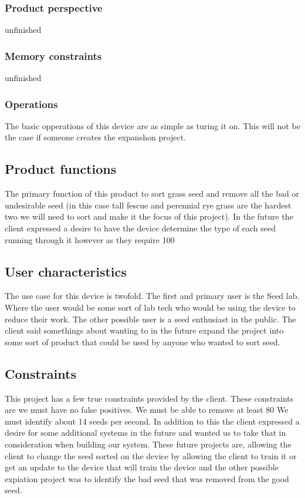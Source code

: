 \documentclass[onecolumn, draftclsnofoot,10pt, compsoc]{IEEEtran}
\begin{document}
\subsubsection{Product perspective}
unfinished

\subsubsection{Memory constraints}
unfinished
\subsubsection{Operations}
The basic opperations of this device are as simple as turing it on.
This will not be the case if someone creates the expanshon project.



\subsection{Product functions}
The primary function of this product to sort grass seed and remove all the bad or undesirable seed (in this case tall fescue and perennial rye grass are the hardest two we will need to sort and make it the focus of this project).
In the future the client expressed a desire to have the device determine the type of each seed running through it however as they require 100%

\subsection{User characteristics}
The use case for this device is twofold.
The first and primary user is the Seed lab.
Where the user would be some sort of lab tech who would be using the device to reduce their work.
The other possible user is a seed enthusiast in the public.
The client said somethings about wanting to in the future expand the project into some sort of product that could be used by anyone who wanted to sort seed.

\subsection{Constraints}
This project has a few true constraints provided by the client.
These constraints are we must have no false positives. We must be able to remove at least 80%
We must identify about 14 seeds per second.
In addition to this the client expressed a desire for some additional systems in the future and wanted us to take that in consideration when building our system.
These future projects are, allowing the client to change the seed sorted on the device by allowing the client to train it or get an update to the device that will train the device and the other possible expiation project was to identify the bad seed that was removed from the good seed.
\end{document}
